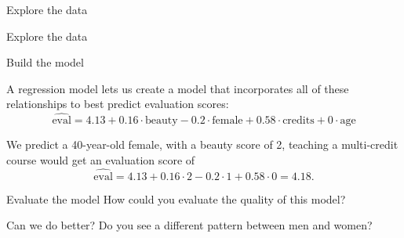 \documentclass{beamer}\usepackage[]{graphicx}\usepackage[]{color}
\newenvironment{knitrout}{}{} %
\begin{document}
\begin{darkframes}
    \begin{frame}{Explore the data}
\begin{knitrout}


\end{knitrout}
    \end{frame}

    \begin{frame}{Explore the data}
\begin{knitrout}


\end{knitrout}
    \end{frame}

    \begin{frame}{Build the model}
      
      \begin{center}
        A regression model lets us create a model that incorporates all of these relationships to best predict evaluation scores:
        \[
          \widehat{\text{eval}} =
            4.13 +
            0.16 \cdot \text{beauty} -
            0.2 \cdot \text{female} +
            0.58 \cdot \text{credits} +
            0 \cdot \text{age}
        \]

        \pause

        We predict a 40-year-old female, with a beauty score of 2, teaching a multi-credit course would get an evaluation score of
        \[
          \widehat{\text{eval}} = 4.13 + 0.16 \cdot 2 - 0.2 \cdot 1 + 0.58 \cdot 0 = 4.18.
        \]

      \end{center}
    \end{frame}

    \begin{frame}{Evaluate the model}
      How could you evaluate the quality of this model?
    \end{frame}

    \begin{frame}{Can we do better?}
      Do you see a different pattern between men and women?


\end{frame}
\end{darkframes}
\end{document}

